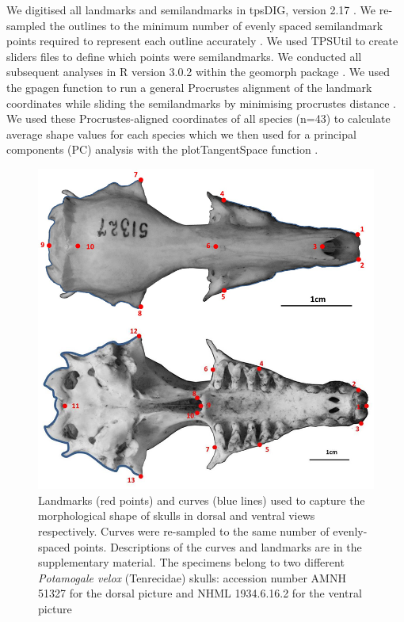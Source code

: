 \documentclass[12pt,a4paper]{article}
\begin{document}
	

	We digitised all landmarks and semilandmarks in tpsDIG, version 2.17 \citep{Rohlf2013}. We re-sampled the outlines to the minimum number of evenly spaced semilandmark points required to represent each outline accurately \citep[][details in supplementary material]{MacLeod2013}. We used TPSUtil \citep{Rohlf2012} to create sliders files \citep{Zelditch2012} to define which points were semilandmarks. We conducted all subsequent analyses in R version 3.0.2 \citep[R Development Core][]{Team2013} within the geomorph package \citep{Adams2013}. We used the gpagen function to run a general Procrustes alignment \citep{Rohlf1993} of the landmark coordinates while sliding the semilandmarks by minimising procrustes distance \citep{Bookstein1997}. We used these Procrustes-aligned coordinates of all species (n=43) to calculate average shape values for each species which we then used for a principal components (PC) analysis with the plotTangentSpace function \citep{Adams2013}. 


	\begin{figure}
	\centering
	\includegraphics[width=1\linewidth]{figures/SkDors+Skvent_landmark_diagrams.png}
	
	\caption{Landmarks (red points) and curves (blue lines) used to capture the morphological shape of skulls in dorsal and ventral views respectively. Curves were re-sampled to the same number of evenly-spaced points. Descriptions of the curves and landmarks are in the supplementary material. The specimens belong to two different \textit{Potamogale velox} (Tenrecidae) skulls: accession number AMNH 51327 for the dorsal picture and NHML 1934.6.16.2 for the ventral picture}
	
	\label{fig:skdors_skvent_landmarks}
	\end{figure}
\end{document}
